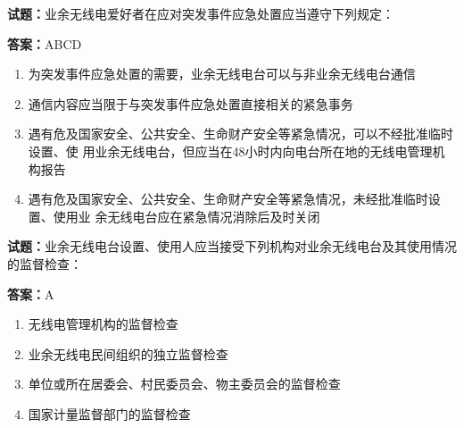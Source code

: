 \documentclass{ctexbook}
\begin{document}




\vspace{1em}

\textbf{试题：}业余无线电爱好者在应对突发事件应急处置应当遵守下列规定： 

\textbf{答案：}ABCD 

\begin{enumerate}[leftmargin=3em]
  \item 为突发事件应急处置的需要，业余无线电台可以与非业余无线电台通信 

  \item 通信内容应当限于与突发事件应急处置直接相关的紧急事务 


  \item 遇有危及国家安全、公共安全、生命财产安全等紧急情况，可以不经批准临时设置、使
用业余无线电台，但应当在48小时内向电台所在地的无线电管理机构报告 

  \item 遇有危及国家安全、公共安全、生命财产安全等紧急情况，未经批准临时设置、使用业
余无线电台应在紧急情况消除后及时关闭 

\end{enumerate}





\vspace{1em}

\textbf{试题：}业余无线电台设置、使用人应当接受下列机构对业余无线电台及其使用情况的监督检查： 

\textbf{答案：}A 

\begin{enumerate}[leftmargin=3em]
  \item 无线电管理机构的监督检查 

  \item 业余无线电民间组织的独立监督检查 

  \item 单位或所在居委会、村民委员会、物主委员会的监督检查 

  \item 国家计量监督部门的监督检查 

\end{enumerate}



\end{document}
